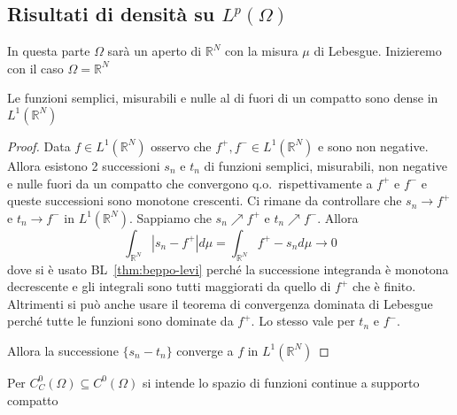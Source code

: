 \subsection{Risultati di densità su \(L^{p}{(\Omega)}\) }
In questa parte \(\Omega\) sarà un aperto di \(\mathbb{R}^{N}\) con la misura
\(\mu\) di Lebesgue. Inizieremo con il caso \(\Omega = \mathbb{R}^{N}\) 
\begin{proposition}\label{prop:risultato_1}
    Le funzioni semplici, misurabili e nulle al di fuori di un compatto sono
    dense in \(L^1(\mathbb{R}^{N})\) 
\end{proposition}
\begin{proof}
    Data \(f \in L^1(\mathbb{R}^{N})\) osservo che \(f^{+}, f^{-} \in
    L^1(\mathbb{R}^{N})\) e sono non negative. Allora esistono 2 successioni
    \(s_{n}\) e \(t_{n}\) di funzioni semplici, misurabili, non negative e nulle fuori da un
    compatto che convergono q.o.~rispettivamente a \(f^{+}\) e \(f^{-}\) e
    queste successioni sono monotone crescenti. Ci rimane da controllare che
    \(s_{n} \to f^{+}\) e \(t_{n} \to f^{-}\) in \(L^{1}{(\mathbb{R}^{N})}\).
    Sappiamo che \(s_{n} \nearrow f^{+}\) e \(t_{n} \nearrow f^{-}\). Allora
    \[
        \int_{\mathbb{R}^{N}} |s_{n} - f^{+}| d\mu = \int_{\mathbb{R}^{N}} f^{+}
        - s_{n} d\mu \to 0
    \]
    dove si è usato BL~\ref{thm:beppo-levi} perché la successione integranda è
    monotona decrescente e gli integrali sono tutti maggiorati da quello di
    \(f^{+}\) che è finito. Altrimenti si può anche usare il teorema di
    convergenza dominata di Lebesgue perché tutte le funzioni sono dominate da
    \(f^{+}\). Lo stesso vale per \(t_{n}\) e \(f^{-}\). 

    Allora la successione \(\{s_{n} - t_{n}\}\) converge a \(f\) in
    \(L^1(\mathbb{R}^{N})\) 
\end{proof}

Per \(C_C^{0}{(\Omega)} \subseteq C^{0}{(\Omega)} \) si intende lo spazio di funzioni continue a supporto
compatto

